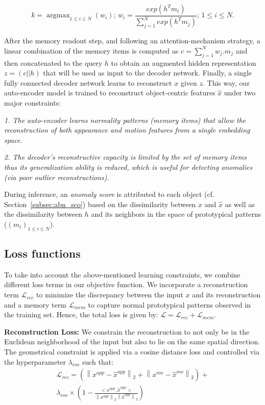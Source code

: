 \documentclass{article}
\DeclareMathOperator*{\argmax}{argmax}
\begin{document}
\begin{equation*} \label{eq:attention}
 k = \argmax_{1\leq i\leq N} \left(w_{i}\right) \text{;  } 
 w_{i} = \frac{exp(h^{T}m_{i})}{\sum_{j=1}^{N} exp(h^{T}m_{j})} \text{; } 1\leq i\leq N.
\end{equation*} 

After the memory readout step, and following an attention-mechanism strategy, a linear combination of the memory items is computed as $ c = \sum_{j=1}^{N} w_{j}.m_{j}$  and then concatenated to the query $h$ to obtain an augmented hidden representation $z = (c||h)$ that will be used as input to the decoder network. Finally, a single fully connected decoder network learns to reconstruct $x$ given $z$. 
This way, our auto-encoder model is trained to reconstruct object-centric features $\hat{x}$ under two major constraints:

\textit{1. The auto-encoder learns normality patterns (memory items) that allow the reconstruction of both appearance and motion features from a single embedding space.}

\textit{2. The decoder's reconstructive capacity is limited by the set of memory items thus its generalization ability is reduced, which is useful for detecting anomalies (via poor outlier reconstructions). }

During inference, an \emph{anomaly score} is attributed to each object (cf. Section~\ref{subsec:abn_sco}) based on the dissimilarity between $x$ and $\hat{x}$ as well as the dissimilarity between $h$ and its neighbors in the space of prototypical patterns ($(m_{i})_{1\leq i\leq N}$). 


\subsection{Loss functions}

To take into account the above-mentioned learning constraints, we combine different loss terms in our objective function. We incorporate a reconstruction term $\mathcal{L}_{rec}$ to minimize the discrepancy between the input $x$ and its reconstruction and a memory term $\mathcal{L}_{mem}$ to capture normal prototypical patterns observed in the training set.  Hence, the total loss is given by:
$\mathcal{L} = \mathcal{L}_{rec} + \mathcal{L}_{mem}$.


\textbf{Reconstruction Loss: } We constrain the reconstruction to not only be in the Euclidean neighborhood of the input but also to lie on the same spatial direction. The geometrical constraint is applied via a cosine distance loss and controlled via the hyperparameter $\lambda_{cos}$ such that:
\begin{multline*}
\mathcal{L}_{rec} = \left(\left\lVert x^{app} - \hat{x}^{app}\right\rVert_{2} + \left\lVert x^{mo} - \hat{x}^{mo}\right\rVert_{2}\right)+ \\ \lambda_{cos}\times\left(
1-\frac{<x^{app},\hat{x}^{app}>}{\left\lVert x^{app}\right\rVert_{2} \left\lVert \hat{x}^{app} \right\rVert_{2}}\right) \end{multline*}
\end{document}
